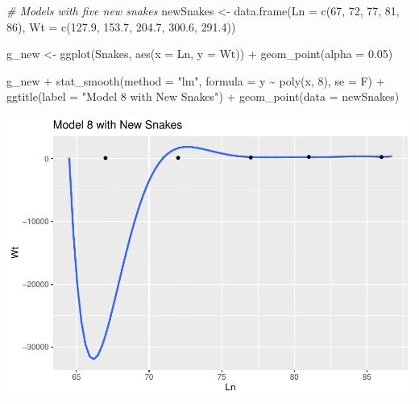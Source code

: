 \documentclass[
]{article}
\newenvironment{Shaded}{\begin{snugshade}}{\end{snugshade}}
\newcommand{\AttributeTok}[1]{\textcolor[rgb]{0.77,0.63,0.00}{#1}}
\newcommand{\CommentTok}[1]{\textcolor[rgb]{0.56,0.35,0.01}{\textit{#1}}}
\newcommand{\DecValTok}[1]{\textcolor[rgb]{0.00,0.00,0.81}{#1}}
\newcommand{\FloatTok}[1]{\textcolor[rgb]{0.00,0.00,0.81}{#1}}
\newcommand{\FunctionTok}[1]{\textcolor[rgb]{0.00,0.00,0.00}{#1}}
\newcommand{\NormalTok}[1]{#1}
\newcommand{\OtherTok}[1]{\textcolor[rgb]{0.56,0.35,0.01}{#1}}
\newcommand{\SpecialCharTok}[1]{\textcolor[rgb]{0.00,0.00,0.00}{#1}}
\newcommand{\StringTok}[1]{\textcolor[rgb]{0.31,0.60,0.02}{#1}}
\begin{document}
\begin{Shaded}
\begin{Highlighting}[]
\CommentTok{\# Models with five new snakes}
\NormalTok{newSnakes }\OtherTok{\textless{}{-}} \FunctionTok{data.frame}\NormalTok{(}\AttributeTok{Ln =} \FunctionTok{c}\NormalTok{(}\DecValTok{67}\NormalTok{, }\DecValTok{72}\NormalTok{, }\DecValTok{77}\NormalTok{, }\DecValTok{81}\NormalTok{, }\DecValTok{86}\NormalTok{),}
                        \AttributeTok{Wt =} \FunctionTok{c}\NormalTok{(}\FloatTok{127.9}\NormalTok{, }\FloatTok{153.7}\NormalTok{, }\FloatTok{204.7}\NormalTok{, }\FloatTok{300.6}\NormalTok{,   }\FloatTok{291.4}\NormalTok{))}

\NormalTok{g\_new }\OtherTok{\textless{}{-}} \FunctionTok{ggplot}\NormalTok{(Snakes, }\FunctionTok{aes}\NormalTok{(}\AttributeTok{x =}\NormalTok{ Ln, }\AttributeTok{y =}\NormalTok{ Wt)) }\SpecialCharTok{+}
  \FunctionTok{geom\_point}\NormalTok{(}\AttributeTok{alpha =} \FloatTok{0.05}\NormalTok{)}

\NormalTok{g\_new }\SpecialCharTok{+} \FunctionTok{stat\_smooth}\NormalTok{(}\AttributeTok{method =} \StringTok{"lm"}\NormalTok{,}
                    \AttributeTok{formula =}\NormalTok{ y }\SpecialCharTok{\textasciitilde{}} \FunctionTok{poly}\NormalTok{(x, }\DecValTok{8}\NormalTok{),}
                    \AttributeTok{se =}\NormalTok{ F) }\SpecialCharTok{+}
  \FunctionTok{ggtitle}\NormalTok{(}\AttributeTok{label =} \StringTok{"Model 8 with New Snakes"}\NormalTok{) }\SpecialCharTok{+}
  \FunctionTok{geom\_point}\NormalTok{(}\AttributeTok{data =}\NormalTok{ newSnakes)}
\end{Highlighting}
\end{Shaded}

\includegraphics{Class_Exercises_ClassNotes_5_files/figure-latex/unnamed-chunk-53-1.pdf}
\newpage
\end{document}
